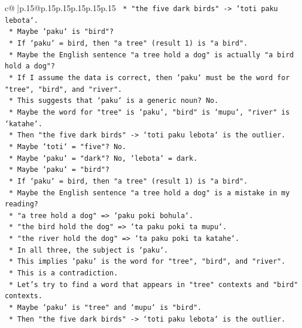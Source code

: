 \documentclass{article}
\begin{document}
{\begin{supertabular}{c@{$\;$}|p{.15\linewidth}@{}p{.15\linewidth}p{.15\linewidth}p{.15\linewidth}p{.15\linewidth}p{.15\linewidth}}
{{{\texttt{            *   "the five dark birds" {-}> `toti paku lebota`.} \\
\texttt{            *   Maybe `paku` is "bird"?} \\
\texttt{            *   If `paku` = bird, then "a tree" (result 1) is "a bird".} \\
\texttt{            *   Maybe the English sentence "a tree hold a dog" is actually "a bird hold a dog"?} \\
\texttt{            *   If I assume the data is correct, then `paku` must be the word for "tree", "bird", and "river".} \\
\texttt{            *   This suggests that `paku` is a generic noun? No.} \\
\texttt{            *   Maybe the word for "tree" is `paku`, "bird" is `mupu`, "river" is `katahe`.} \\
\texttt{            *   Then "the five dark birds" {-}> `toti paku lebota` is the outlier.} \\
\texttt{            *   Maybe `toti` = "five"? No.} \\
\texttt{            *   Maybe `paku` = "dark"? No, `lebota` = dark.} \\
\texttt{            *   Maybe `paku` = "bird"?} \\
\texttt{            *   If `paku` = bird, then "a tree" (result 1) is "a bird".} \\
\texttt{            *   Maybe the English sentence "a tree hold a dog" is a mistake in my reading?} \\
\texttt{            *   "a tree hold a dog" => `paku poki bohula`.} \\
\texttt{            *   "the bird hold the dog" => `ta paku poki ta mupu`.} \\
\texttt{            *   "the river hold the dog" => `ta paku poki ta katahe`.} \\
\texttt{            *   In all three, the subject is `paku`.} \\
\texttt{            *   This implies `paku` is the word for "tree", "bird", and "river".} \\
\texttt{            *   This is a contradiction.} \\
\texttt{            *   Let's try to find a word that appears in "tree" contexts and "bird" contexts.} \\
\texttt{            *   Maybe `paku` is "tree" and `mupu` is "bird".} \\
\texttt{            *   Then "the five dark birds" {-}> `toti paku lebota` is the outlier.} \\
}}}
\end{supertabular}}
\end{document}
